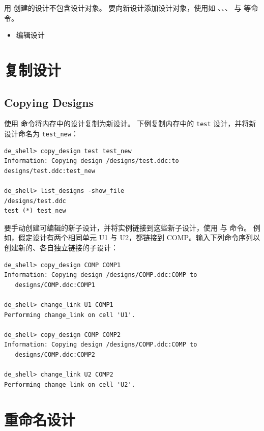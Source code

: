 用  创建的设计不包含设计对象。
要向新设计添加设计对象，使用如 、、、 与  等命令。

\begin{seeAlsoBox}
\begin{itemize}
  \item 编辑设计
\end{itemize}
\end{seeAlsoBox}

\section{复制设计}
\subsection*{Copying Designs}

使用  命令将内存中的设计复制为新设计。
下例复制内存中的 \texttt{test} 设计，并将新设计命名为 \texttt{test\_new}：
\begin{lstlisting}
de_shell> copy_design test test_new
Information: Copying design /designs/test.ddc:to
designs/test.ddc:test_new

de_shell> list_designs -show_file
/designs/test.ddc
test (*) test_new
\end{lstlisting}

要手动创建可编辑的新子设计，并将实例链接到这些新子设计，使用  与  命令。
例如，假定设计有两个相同单元 U1 与 U2，都链接到 COMP。输入下列命令序列以创建新的、各自独立链接的子设计：
\begin{lstlisting}
de_shell> copy_design COMP COMP1
Information: Copying design /designs/COMP.ddc:COMP to
   designs/COMP.ddc:COMP1

de_shell> change_link U1 COMP1
Performing change_link on cell 'U1'.

de_shell> copy_design COMP COMP2
Information: Copying design /designs/COMP.ddc:COMP to
   designs/COMP.ddc:COMP2

de_shell> change_link U2 COMP2
Performing change_link on cell 'U2'.
\end{lstlisting}

\section{重命名设计}
